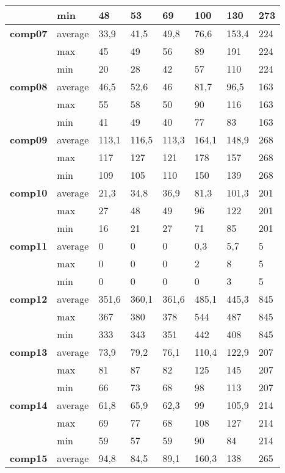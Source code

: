 \begin{table}[!h]
{\begin{tabular}{|l|l|l|l|l|l|l|l|}
        & min & 48 & 53 & 69 & 100 & 130 & 273 \\ \hline
        \textbf{comp07} & average & 33,9 & 41,5 & 49,8 & 76,6 & 153,4 & 224 \\
        & max & 45 & 49 & 56 & 89 & 191 & 224 \\
        & min & 20 & 28 & 42 & 57 & 110 & 224 \\ \hline
        \textbf{comp08} & average & 46,5 & 52,6 & 46 & 81,7 & 96,5 & 163 \\
        & max & 55 & 58 & 50 & 90 & 116 & 163 \\
        & min & 41 & 49 & 40 & 77 & 83 & 163 \\ \hline
        \textbf{comp09} & average & 113,1 & 116,5 & 113,3 & 164,1 & 148,9 & 268 \\
        & max & 117 & 127 & 121 & 178 & 157 & 268 \\
        & min & 109 & 105 & 110 & 150 & 139 & 268 \\ \hline
        \textbf{comp10} & average & 21,3 & 34,8 & 36,9 & 81,3 & 101,3 & 201 \\
        & max & 27 & 48 & 49 & 96 & 122 & 201 \\
        & min & 16 & 21 & 27 & 71 & 85 & 201 \\ \hline
        \textbf{comp11} & average & 0 & 0 & 0 & 0,3 & 5,7 & 5 \\
        & max & 0 & 0 & 0 & 2 & 8 & 5 \\
        & min & 0 & 0 & 0 & 0 & 3 & 5 \\ \hline
        \textbf{comp12} & average & 351,6 & 360,1 & 361,6 & 485,1 & 445,3 & 845 \\
        & max & 367 & 380 & 378 & 544 & 487 & 845 \\
        & min & 333 & 343 & 351 & 442 & 408 & 845 \\ \hline
        \textbf{comp13} & average & 73,9 & 79,2 & 76,1 & 110,4 & 122,9 & 207 \\
        & max & 81 & 87 & 82 & 125 & 145 & 207 \\
        & min & 66 & 73 & 68 & 98 & 113 & 207 \\ \hline
        \textbf{comp14} & average & 61,8 & 65,9 & 62,3 & 99 & 105,9 & 214 \\
        & max & 69 & 77 & 68 & 108 & 127 & 214 \\
        & min & 59 & 57 & 59 & 90 & 84 & 214 \\ \hline
        \textbf{comp15} & average & 94,8 & 84,5 & 89,1 & 160,3 & 138 & 265 \\

\end{tabular}}
\end{table}

